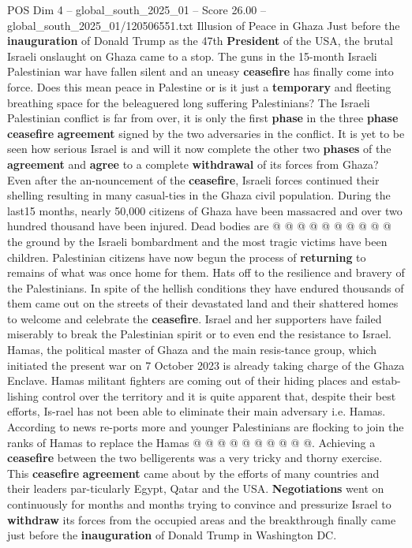 \begin{textsample}{POS Dim 4 – global\_south\_2025\_01 – Score 26.00 – global\_south\_2025\_01/120506551.txt}  \label{ex:f4_pos_013}
Illusion of Peace in Ghaza Just before the \textbf{inauguration} of Donald Trump as the 47th \textbf{President} of the USA, the brutal Israeli onslaught on Ghaza came to a stop.
The guns in the 15-month Israeli Palestinian war have fallen silent and an uneasy \textbf{ceasefire} has finally come into force.
Does this mean peace in Palestine or is it just a \textbf{temporary} and fleeting breathing space for the beleaguered long suffering Palestinians?
The Israeli Palestinian conflict is far from over, it is only the first \textbf{phase} in the three \textbf{phase} \textbf{ceasefire} \textbf{agreement} signed by the two adversaries in the conflict.
It is yet to be seen how serious Israel is and will it now complete the other two \textbf{phases} of the \textbf{agreement} and \textbf{agree} to a complete \textbf{withdrawal} of its forces from Ghaza?
Even after the an-nouncement of the \textbf{ceasefire}, Israeli forces continued their shelling resulting in many casual-ties in the Ghaza civil population.
During the last15 months, nearly 50,000 citizens of Ghaza have been massacred and over two hundred thousand have been injured.
Dead bodies are @ @ @ @ @ @ @ @ @ @ the ground by the Israeli bombardment and the most tragic victims have been children.
Palestinian citizens have now begun the process of \textbf{returning} to remains of what was once home for them.
Hats off to the resilience and bravery of the Palestinians.
In spite of the hellish conditions they have endured thousands of them came out on the streets of their devastated land and their shattered homes to welcome and celebrate the \textbf{ceasefire}.
Israel and her supporters have failed miserably to break the Palestinian spirit or to even end the resistance to Israel.
Hamas, the political master of Ghaza and the main resis-tance group, which initiated the present war on 7 October 2023 is already taking charge of the Ghaza Enclave.
Hamas militant fighters are coming out of their hiding places and estab-lishing control over the territory and it is quite apparent that, despite their best efforts, Is-rael has not been able to eliminate their main adversary i.e.
Hamas.
According to news re-ports more and younger Palestinians are flocking to join the ranks of Hamas to replace the Hamas @ @ @ @ @ @ @ @ @ @.
Achieving a \textbf{ceasefire} between the two belligerents was a very tricky and thorny exercise.
This \textbf{ceasefire} \textbf{agreement} came about by the efforts of many countries and their leaders par-ticularly Egypt, Qatar and the USA. \textbf{Negotiations} went on continuously for months and months trying to convince and pressurize Israel to \textbf{withdraw} its forces from the occupied areas and the breakthrough finally came just before the \textbf{inauguration} of Donald Trump in Washington DC.

\end{textsample}
